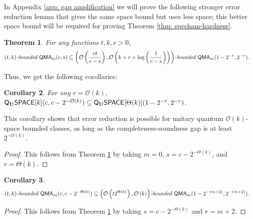 \documentclass[11pt]{article}
\newtheorem{theorem}{Theorem}
\newtheorem{corollary}[theorem]{Corollary}
\theoremstyle{definition}
\theoremstyle{remark}
\newcommand\QMA{{\sf{QMA}}}
\newcommand\bddQMA[5]{{\left(#1,#2\right)}\textit{-bounded }\QMA_{#3}(#4,#5)}
\newcommand{\classfont}{\sf}
\newcommand{\Unitary}{\mathbf{U}}
\newcommand{\unitaryQSPACE}[3]{{\classfont{Q}_\Unitary\classfont{SPACE}}[#1](#2,#3)}
\newcommand\bigoh{\mathcal{O}}
\begin{document}
In Appendix \ref{app: gap amplification} we will prove the following stronger error reduction lemma that gives the same space bound but uses less space; this better space bound will be required for proving Theorem \ref{thm: specham-hardness}.

\begin{theorem} \label{thm: gap amp}
For any functions $t,k,r>0$, 
\[
\bddQMA{t}{k}{m}{c}{s}\subseteq\bddQMA{\mathcal{O}\left(\frac{rt}{c-s}\right)}{\mathcal{O}\left(k+r+\log\left(\frac{1}{c-s}\right)\right)}{m}{1-2^{-r}}{2^{-r}}.
\]
\end{theorem}


Thus, we get the following corollaries:
\begin{corollary} \label{obvious2} For any $r = \mathcal{O}(k)$,
$
\unitaryQSPACE{k}{c}{c-2^{-\bigoh (k)}} \subseteq
\unitaryQSPACE{\Theta(k)}{1-2^{-r}}{2^{-r}}$.
\end{corollary}
This corollary shows that error reduction is possible for unitary quantum $\bigoh(k)$-space bounded classes, as long as the completeness-soundness gap is at least $2^{-\bigoh (k)}$.
\begin{proof}
This follows from Theorem \ref{thm: gap amp} by taking $m=0$, $s = c-2^{-\Theta(k)}$, and $r = \Theta(k)$.
\end{proof}
\begin{corollary}\label{obvious1}
\[
\bddQMA{t}{k}{m}{c}{c-2^{-\Theta(k)}}\subseteq\bddQMA{\mathcal{O}\left(t2^{\Theta(k)}\right)}{\mathcal{O}\left(k\right)}{m}{1-2^{-(m+2)}}{2^{-(m+2)}}.
\]
\end{corollary}
\begin{proof}
This follows from Theorem \ref{thm: gap amp} by taking $s = c-2^{-\Theta(k)}$ and $r = m+2$.
\end{proof}
\end{document}
